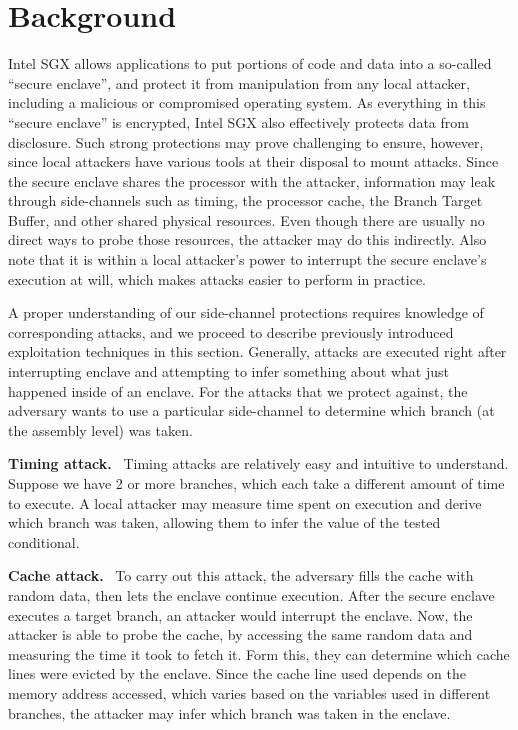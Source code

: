 \documentclass[sigplan, review]{acmart}
\begin{document}
\section{Background}
Intel SGX allows applications to put portions of code and data into a so-called ``secure enclave'', and protect it from manipulation from any local attacker, including a malicious or compromised operating system. As everything in this ``secure enclave'' is encrypted, Intel SGX also effectively protects data from disclosure. Such strong protections may prove challenging to ensure, however, since local attackers have various tools at their disposal to mount attacks. Since the secure enclave shares the processor with the attacker, information may leak through side-channels such as timing, the processor cache, the Branch Target Buffer, and other shared physical resources. Even though there are usually no direct ways to probe those resources, the attacker may do this indirectly. Also note that it is within a local attacker's power to interrupt the secure enclave's execution at will, which makes attacks easier to perform in practice.

A proper understanding of our side-channel protections requires knowledge of corresponding attacks, and we proceed to describe previously introduced exploitation techniques in this section. Generally, attacks are executed right after interrupting enclave and attempting to infer something about what just happened inside of an enclave. For the attacks that we protect against, the adversary wants to use a particular side-channel to determine which branch (at the assembly level) was taken.

\textbf{Timing attack.}~\cite{kocher1996timing} Timing attacks are relatively easy and intuitive to understand. Suppose we have 2 or more branches, which each take a different amount of time to execute. A local attacker may measure time spent on execution and derive which branch was taken, allowing them to infer the value of the tested conditional.

\textbf{Cache attack.}~\cite{osvik2006cache} To carry out this attack, the adversary fills the cache with random data, then lets the enclave continue execution. After the secure enclave executes a target branch, an attacker would interrupt the enclave. Now, the attacker is able to probe the cache, by accessing the same random data and measuring the time it took to fetch it. Form this, they can determine which cache lines were evicted by the enclave. Since the cache line used depends on the memory address accessed, which varies based on the variables used in different branches, the attacker may infer which branch was taken in the enclave.
\end{document}
